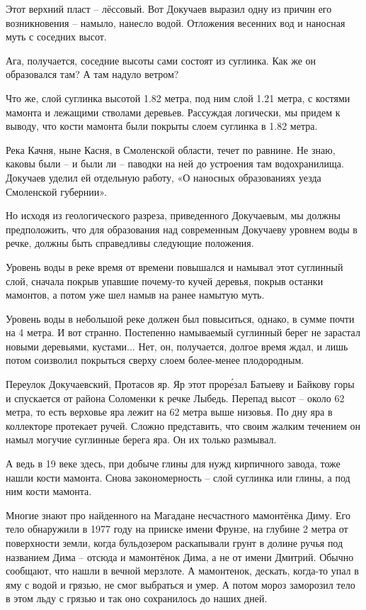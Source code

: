 Этот верхний пласт – лёссовый. Вот Докучаев выразил одну из причин его возникновения – намыло, нанесло водой. Отложения весенних вод и наносная муть с соседних высот.

   Ага, получается, соседние высоты сами состоят из суглинка. Как же он образовался там? А там надуло ветром? 

   Что же, слой суглинка высотой 1.82 метра, под ним слой 1.21 метра, с костями мамонта и лежащими стволами деревьев. Рассуждая логически, мы придем к выводу, что кости мамонта были покрыты слоем суглинка в 1.82 метра.

   Река Качня, ныне Касня, в Смоленской области, течет по равнине. Не знаю, каковы были – и были ли – паводки на ней до устроения там водохранилища. Докучаев уделил ей отдельную работу, «О наносных образованиях уезда Смоленской губернии».

   Но исходя из геологического разреза, приведенного Докучаевым, мы должны предположить, что для образования над современным Докучаеву уровнем воды в речке, должны быть справедливы следующие положения.

   Уровень воды в реке время от времени повышался и намывал этот суглинный слой, сначала покрыв упавшие почему-то кучей деревья, покрыв останки мамонтов, а потом уже шел намыв на ранее намытую муть. 

   Уровень воды в небольшой реке должен был повыситься, однако, в сумме почти на 4 метра. И вот странно. Постепенно намываемый суглинный берег не зарастал новыми деревьями, кустами... Нет, он, получается, долгое время ждал, и лишь потом соизволил покрыться сверху слоем более-менее плодородным.

   Переулок Докучаевский, Протасов яр. Яр этот прор\'езал Батыеву и Байкову горы и спускается от района Соломенки к речке Лыбедь. Перепад высот – около 62 метра, то есть верховье яра лежит на 62 метра выше низовья. По дну яра в коллекторе протекает ручей. Сложно представить, что своим жалким течением он намыл могучие суглинные берега яра. Он их только размывал.

    А ведь в 19 веке здесь, при добыче глины для нужд кирпичного завода, тоже нашли кости мамонта. Снова закономерность – слой суглинка или глины, а под ним кости мамонта. 

Многие знают про найденного на Магадане несчастного мамонтёнка Диму. Его тело обнаружили в 1977 году на прииске имени Фрунзе, на глубине 2 метра от поверхности земли, когда бульдозером раскапывали грунт в долине ручья под названием Дима – отсюда и мамонтёнок Дима, а не от имени Дмитрий. Обычно сообщают, что нашли в вечной мерзлоте. А мамонтенок, дескать, когда-то упал в яму с водой и грязью, не смог выбраться и умер. А потом мороз заморозил тело в этом льду с грязью и так оно сохранилось до наших дней. 

